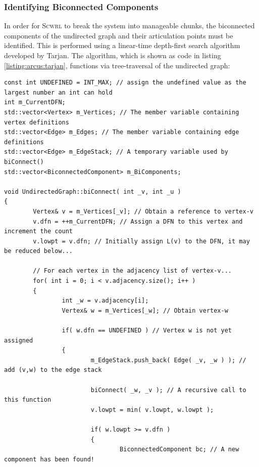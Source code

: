  
\subsubsection{Identifying Biconnected Components}

In order for \textsc{Scwrl} to break the system into manageable chunks, the biconnected components of the undirected graph and their articulation points must be identified. This is performed using a linear-time depth-first search algorithm developed by Tarjan\cite{METHOD:Tarjan1972}. The algorithm, which is shown as \CPP\-code in listing \ref{listing:arcus:tarjan}, functions via tree-traversal of the undirected graph:
\lstset{language=C++}
\begin{lstlisting}[float, caption={ \pd s implementation of Tarjan's algorithm for identifying biconnected components. The entry-point is calcBiConnections(). Prior to execution, m\_Vertices and m\_Edges must be filled with data and both m\_EdgeStack and m\_BiComponents cleared.}, label=listing:arcus:tarjan]
const int UNDEFINED = INT_MAX; // assign the undefined value as the largest number an int can hold
int m_CurrentDFN;
std::vector<Vertex> m_Vertices; // The member variable containing vertex definitions
std::vector<Edge> m_Edges; // The member variable containing edge definitions
std::vector<Edge> m_EdgeStack; // A temporary variable used by biConnect()
std::vector<BiconnectedComponent> m_BiComponents;

void UndirectedGraph::biConnect( int _v, int _u )
{
        Vertex& v = m_Vertices[_v]; // Obtain a reference to vertex-v
        v.dfn = ++m_CurrentDFN; // Assign a DFN to this vertex and increment the count
        v.lowpt = v.dfn; // Initially assign L(v) to the DFN, it may be reduced below...

        // For each vertex in the adjacency list of vertex-v...
        for( int i = 0; i < v.adjacency.size(); i++ )
        {
                int _w = v.adjacency[i];
                Vertex& w = m_Vertices[_w]; // Obtain vertex-w
                
                if( w.dfn == UNDEFINED ) // Vertex w is not yet assigned
                {
                        m_EdgeStack.push_back( Edge( _v, _w ) ); // add (v,w) to the edge stack

                        biConnect( _w, _v ); // A recursive call to this function
                        v.lowpt = min( v.lowpt, w.lowpt );

                        if( w.lowpt >= v.dfn )
                        {     
                                BiconnectedComponent bc; // A new component has been found!
                                

\end{lstlisting}
